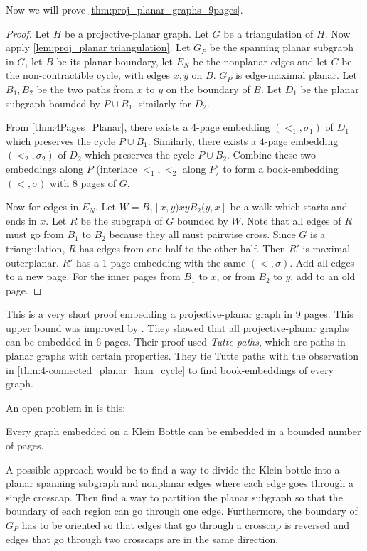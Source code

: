 Now we will prove \cref{thm:proj_planar_graphs_9pages}.
\begin{proof}
    Let $H$ be a projective-planar graph. Let $G$ be a triangulation of $H$.
    Now apply \cref{lem:proj_planar triangulation}. Let $G_P$ be the spanning planar subgraph in $G$, let $B$ be its planar boundary, let $E_N$ be the nonplanar edges and let $C$ be the non-contractible cycle, with edges $x, y$ on $B$. $G_P$ is edge-maximal planar. Let $B_1, B_2$ be the two paths from $x$ to $y$ on the boundary of $B$. Let $D_1$ be the planar subgraph bounded by $P \cup B_1$, similarly for $D_2$. 

    From \cref{thm:4Pages_Planar}, there exists a $4$-page embedding $(<_1, \sigma_1)$ of $D_1$ which preserves the cycle $P \cup B_1$. Similarly, there exists a $4$-page embedding $(<_2, \sigma_2)$ of $D_2$ which preserves the cycle $P \cup B_2$. Combine these two embeddings along $P$ (interlace $<_1, <_2$ along $P$) to form a book-embedding $(<, \sigma)$ with $8$ pages of $G$. 

    Now for edges in $E_N$. Let $W = B_1[x, y) xy B_2(y, x]$ be a walk which starts and ends in $x$. Let $R$ be the subgraph of $G$ bounded by $W$. Note that all edges of $R$ must go from $B_1$ to $B_2$ because they all must pairwise cross. Since $G$ is a triangulation, $R$ has edges from one half to the other half. Then $R'$ is maximal outerplanar. $R'$ has a 1-page embedding with the same $(<, \sigma)$. Add all edges to a new page. For the inner pages from $B_1$ to $x$, or from $B_2$ to $y$, add to an old page. 
\end{proof}

This is a very short proof embedding a projective-planar graph in 9 pages. This upper bound was improved by \textcite{ozekiBookEmbeddingGraphs2019}. They showed that all projective-planar graphs can be embedded in 6 pages. Their proof used \textit{Tutte paths}, which are paths in planar graphs with certain properties. They tie Tutte paths with the observation in \cref{thm:4-connected_planar_ham_cycle} to find book-embeddings of every graph.  

An open problem in \textcite{ozekiBookEmbeddingGraphs2019} is this:
\begin{conjecture}
    Every graph embedded on a Klein Bottle can be embedded in a bounded number of pages.
\end{conjecture}

A possible approach would be to find a way to divide the Klein bottle into a planar spanning subgraph and nonplanar edges where each edge goes through a single crosscap. Then find a way to partition the planar subgraph so that the boundary of each region can go through one edge. Furthermore, the boundary of $G_P$ has to be oriented so that edges that go through a crosscap is reversed and edges that go through two crosscaps are in the same direction. 
